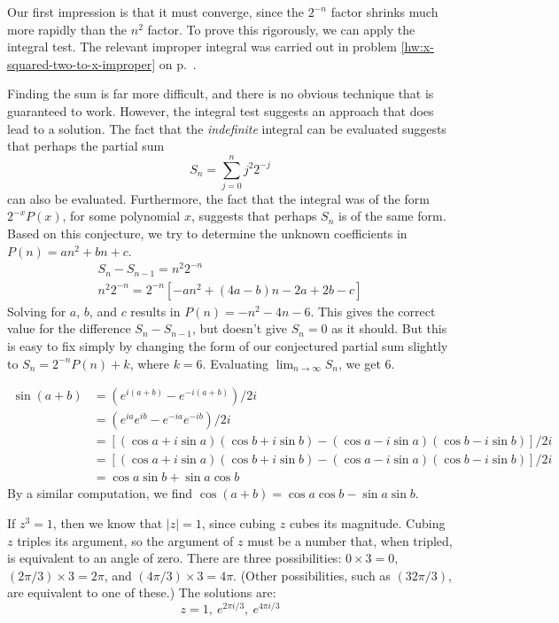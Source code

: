 Our first impression is that it must converge, since the $2^{-n}$ factor shrinks much more rapidly
than the $n^2$ factor. To prove this rigorously, we can apply the integral test. 
The relevant improper integral was carried out in problem \ref{hw:x-squared-two-to-x-improper}
on p.~\pageref{hw:x-squared-two-to-x-improper}.

Finding the sum is far more difficult, and there is no obvious technique that is guaranteed to work.
However, the integral test suggests an approach that does lead to a solution. The fact that the
\emph{indefinite} integral can be evaluated suggests that perhaps the partial sum
\begin{equation*}
  S_n = \sum_{j=0}^{n} j^2 2^{-j}
\end{equation*}
can also be evaluated. Furthermore, the fact that the integral was of the form $2^{-x}P(x)$, for some
polynomial $x$, suggests that perhaps $S_n$ is of the same form. Based on this conjecture, we
try to determine the unknown coefficients in $P(n)=an^2+bn+c$.
\begin{gather*}
  S_n-S_{n-1} = n^2 2^{-n} \\
  n^2 2^{-n} = 2^{-n}\left[-an^2+(4a-b)n-2a+2b-c\right]
\end{gather*}
Solving for $a$, $b$, and $c$ results in $P(n)=-n^2-4n-6$. This gives the correct value for the
difference $S_n-S_{n-1}$, but doesn't give $S_n=0$ as it should. But this is easy to fix simply
by changing the form of our conjectured partial sum slightly to $S_n=2^{-n}P(n)+k$, where
$k=6$. Evaluating $\lim_{n\rightarrow\infty}S_n$, we get 6.


\begin{align*}
\sin(a+b) &= \left(e^{i(a+b)}-e^{-i(a+b)}\right)/2i \\
          &= \left(e^{ia}e^{ib}-e^{-ia}e^{-ib}\right)/2i \\
          &= \left[(\cos a+i\sin a)(\cos b+i\sin b)-(\cos a-i\sin a)(\cos b-i\sin b)\right]/2i \\
          &= \left[(\cos a+i\sin a)(\cos b+i\sin b)-(\cos a-i\sin a)(\cos b-i\sin b)\right]/2i \\
          &= \cos a\sin b +\sin a\cos b 
\end{align*}
By a similar computation, we find $\cos(a+b)=\cos a\cos b-\sin a\sin b$.

If $z^3=1$, then we know that $|z|=1$, since cubing $z$ cubes its magnitude. Cubing $z$ triples
its argument, so the argument of $z$ must be a number that, when tripled, is equivalent to an
angle of zero. There are three possibilities: $0\times 3=0$, $(2\pi/3)\times 3=2\pi$,
and $(4\pi/3)\times 3=4\pi$. (Other possibilities, such as $(32\pi/3)$, are equivalent to
one of these.) The solutions are:
\begin{equation*}
z = 1,\ e^{2\pi i/3},\ e^{4\pi i/3}
\end{equation*}

